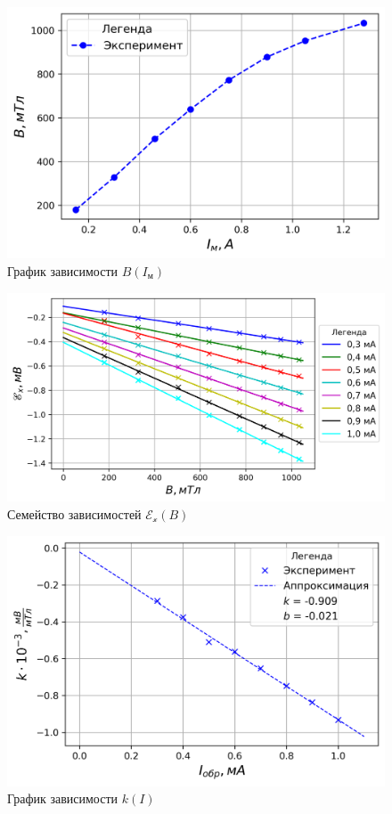 \documentclass[a4paper, 12pt]{article}
\begin{document}
\begin{figure}[h!]
\begin{center}
\includegraphics{graphB(I).png}
\end{center}
\caption{График зависимости $B(I_\text{м})$}
\label{B(I)graph}
\end{figure}

\begin{figure}[h!]
\begin{center}
\includegraphics{graphE(B).png}
\end{center}
\caption{Семейство зависимостей $\mathscr{E_\text{x}}(B)$}
\label{E(B)graph}
\end{figure}

\begin{figure}[h!]
\begin{center}
\includegraphics{graphk(I).png}
\end{center}
\caption{График зависимости $k(I)$}
\label{k(I)graph}
\end{figure}
\end{document}
